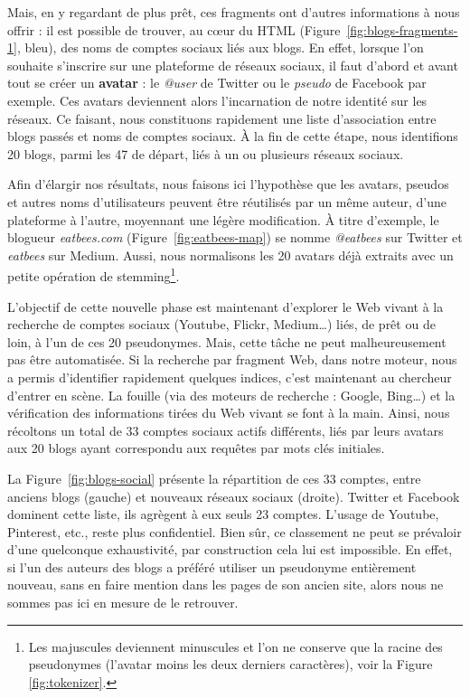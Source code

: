 \documentclass[symmetric,justified,marginals=raggedouter]{tufte-book}
\begin{document}
Mais, en y regardant de plus prêt, ces fragments ont d'autres informations à nous offrir : il est possible de trouver, au cœur du HTML (Figure~\ref{fig:blogs-fragments-1}, bleu), des noms de comptes sociaux liés aux blogs. En effet, lorsque l'on souhaite s'inscrire sur une plateforme de réseaux sociaux, il faut d'abord et avant tout se créer un \textbf{avatar} : le \textit{@user} de Twitter ou le \textit{pseudo} de Facebook par exemple. Ces avatars deviennent alors l'incarnation de notre identité sur les réseaux. Ce faisant, nous constituons rapidement une liste d'association entre blogs passés et noms de comptes sociaux. À la fin de cette étape, nous identifions 20 blogs, parmi les 47 de départ, liés à un ou plusieurs réseaux sociaux.

Afin d'élargir nos résultats, nous faisons ici l'hypothèse que les avatars, pseudos et autres noms d'utilisateurs peuvent être réutilisés par un même auteur, d'une plateforme à l'autre, moyennant une légère modification. À titre d'exemple, le blogueur \textit{eatbees.com} (Figure~\ref{fig:eatbees-map}) se nomme \textit{@eatbees} sur Twitter et \textit{eatbees} sur Medium. Aussi, nous normalisons les 20 avatars déjà extraits avec un petite opération de stemming\footnote{\RaggedOuter Les majuscules deviennent minuscules et l'on ne conserve que la racine des pseudonymes (l'avatar moins les deux derniers caractères), voir la Figure \ref{fig:tokenizer}.}. 

L'objectif de cette nouvelle phase est maintenant d'explorer le Web vivant à la recherche de comptes sociaux (Youtube, Flickr, Medium\ldots{}) liés, de prêt ou de loin, à l'un de ces 20 pseudonymes. Mais, cette tâche ne peut malheureusement pas être automatisée. Si la recherche par fragment Web, dans notre moteur, nous a permis d'iden\-tifier rapidement quelques indices, c'est maintenant au chercheur d'en\-trer en scène. La fouille (via des moteurs de recherche : Google, Bing\ldots{}) et la vérification des informations tirées du Web vivant se font à la main. Ainsi, nous récoltons un total de 33 comptes sociaux actifs différents, liés par leurs avatars aux 20 blogs ayant correspondu aux requêtes par mots clés initiales. 

La Figure~\ref{fig:blogs-social} présente la répartition de ces 33 comptes, entre anciens blogs (gauche) et nouveaux réseaux sociaux (droite). Twitter et Facebook dominent cette liste, ils agrègent à eux seuls 23 comptes. L'usage de Youtube, Pinterest, etc., reste plus confidentiel. Bien sûr, ce classement ne peut  se prévaloir d'une quelconque exhaustivité, par construction cela lui est impossible. En effet, si l'un des auteurs des blogs a préféré utiliser un pseudonyme entièrement nouveau, sans en faire mention dans les pages de son ancien site, alors nous ne sommes pas ici en mesure de le retrouver.
\end{document}
